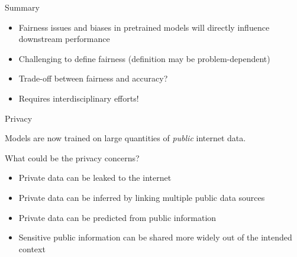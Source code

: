 \documentclass[usenames,dvipsnames,notes,11pt,aspectratio=169,hyperref={colorlinks=true, linkcolor=blue}]{beamer}
\begin{document}
\begin{frame}
    {Summary}
    \begin{itemize}
        \item Fairness issues and biases in pretrained models will directly influence downstream performance
        \item Challenging to define fairness (definition may be problem-dependent)
        \item Trade-off between fairness and accuracy?
        \item Requires interdisciplinary efforts!
    \end{itemize}
\end{frame}

\begin{frame}
    {Privacy}

    Models are now trained on large quantities of \textit{public} internet data.

    What could be the privacy concerns?\\\pause
    \begin{itemize}
        \item Private data can be leaked to the internet
        \item Private data can be inferred by linking multiple public data sources
        \item Private data can be predicted from public information
        \item Sensitive public information can be shared more widely out of the intended context
    \end{itemize}
\end{frame}
\end{document}
